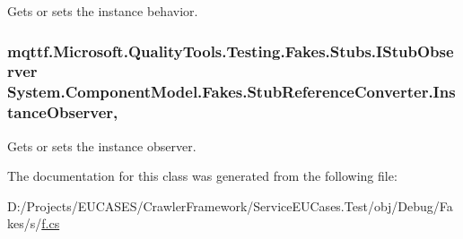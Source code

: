 Gets or sets the instance behavior.

\hypertarget{class_system_1_1_component_model_1_1_fakes_1_1_stub_reference_converter_ae086fb96a5174a661668fa25998ce510}{
\subsubsection[{Instance\-Observer}]{\setlength{\rightskip}{0pt plus 5cm}mqttf.\-Microsoft.\-Quality\-Tools.\-Testing.\-Fakes.\-Stubs.\-I\-Stub\-Observer System.\-Component\-Model.\-Fakes.\-Stub\-Reference\-Converter.\-Instance\-Observer\hspace{0.3cm}{\ttfamily [get]}, {\ttfamily [set]}}}\label{class_system_1_1_component_model_1_1_fakes_1_1_stub_reference_converter_ae086fb96a5174a661668fa25998ce510}


Gets or sets the instance observer.



The documentation for this class was generated from the following file\-:\begin{DoxyCompactItemize}
\item 
D\-:/\-Projects/\-E\-U\-C\-A\-S\-E\-S/\-Crawler\-Framework/\-Service\-E\-U\-Cases.\-Test/obj/\-Debug/\-Fakes/s/\hyperlink{s_2f_8cs}{f.\-cs}\end{DoxyCompactItemize}
